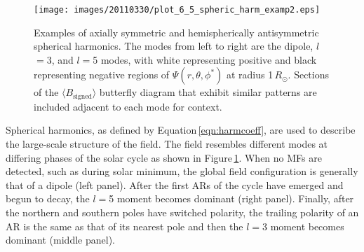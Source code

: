 \documentclass[namedreferences]{solarphysics}
\begin{document}
\begin{article}


\begin{figure}[!t]
\begin{center}
\texttt{[image: images/20110330/plot\_6\_5\_spheric\_harm\_examp2.eps]}
\end{center}
\caption{Examples of axially symmetric and hemispherically antisymmetric spherical harmonics. The modes from left to right are the dipole, $l$$=$3, and $l$$=$5 modes, with white representing positive and black representing negative regions of $\Psi(r,\theta,\phi^*)$ at radius 1\,$R_{\odot}$. Sections of the $\langle B_{\mathrm{signed}} \rangle$ butterfly diagram that exhibit similar patterns are included adjacent to each mode for context.}
\label{plot_6_5_spheric_harm_examp}
\end{figure}

Spherical harmonics, as defined by Equation\,\ref{eqn:harmcoeff}, are used to describe the large-scale structure of the field. The field resembles different modes at differing phases of the solar cycle as shown in Figure\,\ref{plot_6_5_spheric_harm_examp}. When no MFs are detected, such as during solar minimum, the global field configuration is generally that of a dipole (left panel). After the first ARs of the cycle have emerged and begun to decay, the $l$$=$5 moment becomes dominant (right panel). Finally, after the northern and southern poles have switched polarity, the trailing polarity of an AR is the same as that of its nearest pole and then the $l$$=$3 moment becomes dominant (middle panel).



\end{article}
\end{document}

